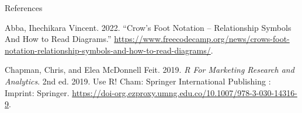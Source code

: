 \documentclass[
  ignorenonframetext,
]{beamer}
\newlength{\cslhangindent}
\newenvironment{CSLReferences}[2] %
 {\begin{list}{}{%
  \setlength{\itemindent}{0pt}
  \setlength{\leftmargin}{0pt}
  \setlength{\parsep}{0pt}
  \ifodd #1
   \setlength{\leftmargin}{\cslhangindent}
   \setlength{\itemindent}{-1\cslhangindent}
  \fi
  \setlength{\itemsep}{#2\baselineskip}}}
 {\end{list}}
\begin{document}
\begin{frame}[allowframebreaks]{References}
\label{refs}
\begin{CSLReferences}{1}{0}
Abba, Ihechikara Vincent. 2022. {``Crow's {Foot} {Notation} --
{Relationship} {Symbols} {And} {How} to {Read} {Diagrams}.''}
\url{https://www.freecodecamp.org/news/crows-foot-notation-relationship-symbols-and-how-to-read-diagrams/}.

Chapman, Chris, and Elea McDonnell Feit. 2019. \emph{R {For} {Marketing}
{Research} and {Analytics}}. 2nd ed. 2019. Use {R}! Cham: Springer
International Publishing : Imprint: Springer.
\url{https://doi-org.ezproxy.umng.edu.co/10.1007/978-3-030-14316-9}.

\end{CSLReferences}
\end{frame}
\end{document}
